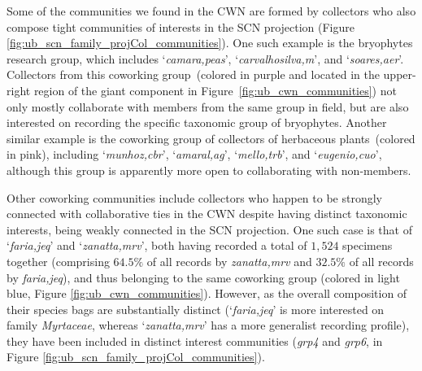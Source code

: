 Some of the communities we found in the CWN are formed by collectors who also compose tight communities of interests in the SCN projection (Figure \ref{fig:ub_scn_family_projCol_communities}).
%
One such example is the bryophytes research group, which includes `\textit{camara,peas}', `\textit{carvalhosilva,m}', and `\textit{soares,aer}'.
Collectors from this coworking group~(colored in purple and located in the upper-right region of the giant component in Figure~\ref{fig:ub_cwn_communities}) not only mostly collaborate with members from the same group in field, but are also interested on recording the specific taxonomic group of bryophytes.
%
Another similar example is the coworking group of collectors of herbaceous plants~(colored in pink), including `\textit{munhoz,cbr}', `\textit{amaral,ag}', `\textit{mello,trb}', and `\textit{eugenio,cuo}', although this group is apparently more open to collaborating with non-members.

Other coworking communities include collectors who happen to be strongly connected with collaborative ties in the CWN despite having distinct taxonomic interests, being weakly connected in the SCN projection.
One such case is that of `\textit{faria,jeq}' and `\textit{zanatta,mrv}', both having recorded a total of $1,524$ specimens together (comprising $64.5\%$ of all records by \textit{zanatta,mrv} and $32.5\%$ of all records by \textit{faria,jeq}), and thus belonging to the same coworking group (colored in light blue, Figure \ref{fig:ub_cwn_communities}).
However, as the overall composition of their species bags are substantially distinct (`\textit{faria,jeq}' is more interested on family \textit{Myrtaceae}, whereas `\textit{zanatta,mrv}' has a more generalist recording profile), they have been included in distinct interest communities (\textit{grp4} and \textit{grp6}, in Figure \ref{fig:ub_scn_family_projCol_communities}).

